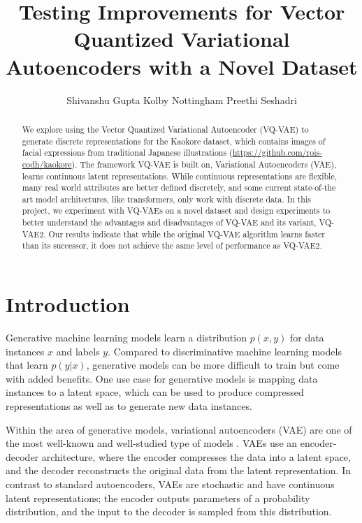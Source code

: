 \documentclass{article}
\title{Testing Improvements for Vector Quantized Variational Autoencoders with a Novel Dataset}
\author{
  Shivanshu Gupta
  \And
  Kolby Nottingham
  \And
  Preethi Seshadri
}
\begin{document}
\maketitle

\begin{abstract}
    We explore using the Vector Quantized Variational Autoencoder (VQ-VAE) to generate discrete representations for the Kaokore dataset, which contains images of facial expressions from traditional Japanese illustrations (\url{https://github.com/rois-codh/kaokore}).
    The framework VQ-VAE is built on, Variational Autoencoders (VAE), learns continuous latent representations.
    While continuous representations are flexible, many real world attributes are better defined discretely, and some current state-of-the art model architectures, like transformers, only work with discrete data. 
    In this project, we experiment with VQ-VAEs on a novel dataset and design experiments to better understand the advantages and disadvantages of VQ-VAE and its variant, VQ-VAE2.
    Our results indicate that while the original VQ-VAE algorithm learns faster than its successor, it does not achieve the same level of performance as VQ-VAE2. 
\end{abstract}

\section{Introduction}

Generative machine learning models learn a distribution $p(x,y)$ for data instances $x$ and labels $y$. Compared to discriminative machine learning models that learn $p(y|x)$, generative models can be more difficult to train but come with added benefits. One use case for generative models is mapping data instances to a latent space, which can be used to produce compressed representations as well as to generate new data instances. 

Within the area of generative models, variational autoencoders (VAE) are one of the most well-known and well-studied type of models \cite{VAE}. VAEs use an encoder-decoder architecture, where the encoder compresses the data into a latent space, and the decoder reconstructs the original data from the latent representation. In contrast to standard autoencoders, VAEs are stochastic and have continuous latent representations; the encoder outputs parameters of a probability distribution, and the input to the decoder is sampled from this distribution.
\end{document}
